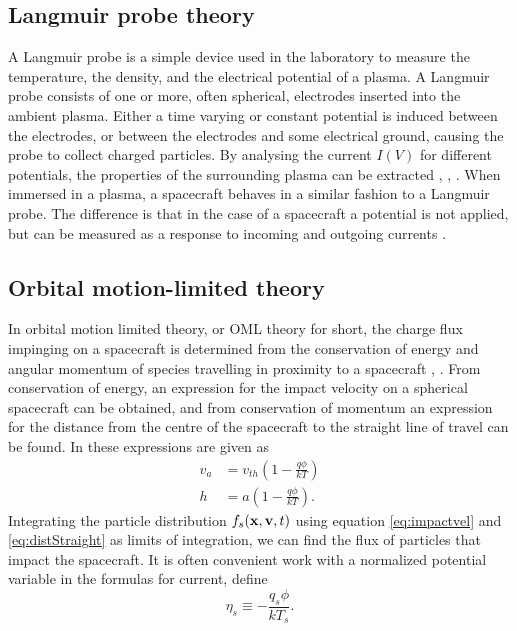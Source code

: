 \subsection{Langmuir probe theory}
A Langmuir probe is a simple device used in the laboratory to measure the temperature, the density, and the electrical potential of a plasma. A Langmuir probe consists of one or more, often spherical, electrodes inserted into the ambient plasma. Either a time varying or constant potential is induced between the electrodes, or between the electrodes and some electrical ground, causing the probe to collect charged particles. By analysing the current $I(V)$ for different potentials, the properties of the surrounding plasma can be extracted  \parencite{Garrett1981}, \parencite{LAI2019}, \parencite{Miloch2012}. When immersed in a plasma, a spacecraft behaves in a similar fashion to a Langmuir probe. The difference is that in the case of a spacecraft a potential is not applied, but can be measured as a response to incoming and outgoing currents \parencite[Ch. 2]{LAI2019}. 


\subsection*{Orbital motion-limited theory}
In orbital motion limited theory, or OML theory for short, the charge flux impinging on a spacecraft is determined from the conservation of energy and angular momentum of species travelling in proximity to a spacecraft \parencite{LAI2019}, \parencite{Garrett1981}. From conservation of energy, an expression for the impact velocity on a spherical spacecraft can be obtained, and from conservation of momentum an expression for the distance from the centre of the spacecraft to the straight line of travel can be found. In \parencite[Ch. 2.1]{LAI2019} these expressions are given as
\begin{subequations}
    \begin{align}
        v_a &= v_{th} \left(1 - \frac{q \phi}{kT} \right) \label{eq:impactvel} \\
        h &= a \left(1 - \frac{q \phi}{kT} \right). \label{eq:distStraight}
    \end{align}
\end{subequations}
Integrating the particle distribution $f_s(\vb{x}, \vb{v}, t)$ using equation \eqref{eq:impactvel} and \eqref{eq:distStraight} as limits of integration, we can find the flux of particles that impact the spacecraft. It is often convenient work with a normalized potential variable in the formulas for current, define
\begin{equation}\label{eq:normPot}
    \eta_s \equiv - \frac{q_s \phi}{k T_s}.
\end{equation}

